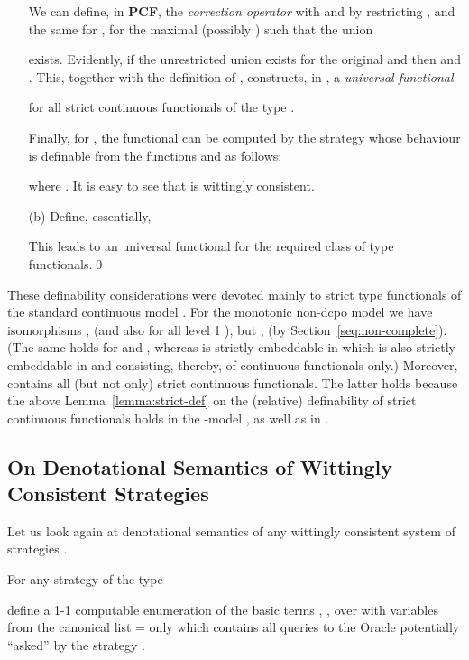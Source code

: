 \documentclass[fleqn]{LMCS}
\theoremstyle{plain}\newtheorem{satz}[thm]{Satz}
\theoremstyle{plain}\newtheorem{hyp}[thm]{Hypothesis}
\theoremstyle{plain}\newtheorem{hyps}[thm]{Hypotheses}
\theoremstyle{definition}\newtheorem{note}[thm]{Note}
\newcommand{\PCF}{\mbox{\bf PCF}}
\newcommand{\?}{\mbox{?}}
\begin{document}
\begin{enumerate}[(a)]
We can define, in \PCF, 
the \emph{correction operator}  
with  and  
by restricting , and the same 
for , for the maximal  (possibly ) such that 
the union 

exists. 
Evidently, if the unrestricted union exists for the original 
 and  then  and . 
This, together with the definition of , 
constructs, in , a \emph{universal functional} 

for all strict continuous functionals of the type .  


Finally, for , the functional 
 can be computed by the strategy  whose behaviour 
is definable from the functions  and  as follows: 

where 
.
It is easy to see that  is wittingly consistent. 




\item[(b)] 
Define, essentially, 

This leads to an universal functional for the required class of 
type  functionals.\qed
\end{enumerate}

\noindent
These definability considerations were devoted   
mainly to strict type 
\mbox{} 
functionals of the standard continuous model . 
For the monotonic non-dcpo model  we have isomorphisms   
, 
(and also for all level 1 ),
but 
, 
(by Section~\ref{seq:non-complete}). 
(The same holds for  and , 
whereas 
 is strictly embeddable in 
 which is also strictly embeddable in 
 and consisting, thereby, of continuous 
functionals only.) 
Moreover,   contains all (but not only) 
strict continuous functionals. 
The latter holds because the above Lemma~\ref{lemma:strict-def} 
on the (relative) definability of strict continuous functionals holds 
in the -model , as well as in .




\subsection{On Denotational Semantics of Wittingly Consistent Strategies}
\label{sec:den-sem-wit-strat}


\noindent
Let us look again at denotational semantics of 
any wittingly consistent 
system of strategies . 


For any 
strategy  of the type 
  
define a 1-1 computable enumeration 
of the basic terms  
, 
, over  with variables from the canonical list 
 =  only 
which contains all queries to the Oracle 
potentially ``asked'' by the strategy .  
\end{document}
